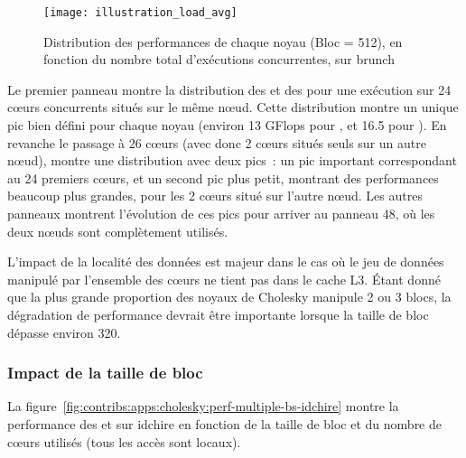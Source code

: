 \begin{figure}[ht]
  \centering
  \texttt{[image: illustration\_load\_avg]}
  \caption{Distribution des performances de chaque noyau (Bloc = 512), en fonction du nombre total d'exécutions concurrentes, sur brunch}\label{fig:contribs:apps:cholesky:distrib-load-512}
\end{figure}

Le premier panneau montre la distribution des \gemm et des \potrf pour une exécution sur 24 cœurs concurrents situés sur le même nœud.
Cette distribution montre un unique pic bien défini pour chaque noyau (environ 13 GFlops pour \potrf, et 16.5 pour \gemm).
En revanche le passage à 26 cœurs (avec donc 2 cœurs situés seuls sur un autre nœud), montre une distribution avec deux pics~: un pic important correspondant au 24 premiers cœurs, et un second pic plus petit, montrant des performances beaucoup plus grandes, pour les 2 cœurs situé sur l'autre nœud.
Les autres panneaux montrent l'évolution de ces pics pour arriver au panneau 48, où les deux nœuds sont complètement utilisés.



L'impact de la localité des données est majeur dans le cas où le jeu de données manipulé par l'ensemble des cœurs ne tient pas dans le cache L3.
Étant donné que la plus grande proportion des noyaux de Cholesky manipule 2 ou 3 blocs, la dégradation de performance devrait être importante lorsque la taille de bloc dépasse environ 320.




\subsubsection{Impact de la taille de bloc}

La figure~\ref{fig:contribs:apps:cholesky:perf-multiple-bs-idchire} montre la performance des \gemm et \potrf sur idchire en fonction de la taille de bloc et du nombre de cœurs utilisés (tous les accès sont locaux).

